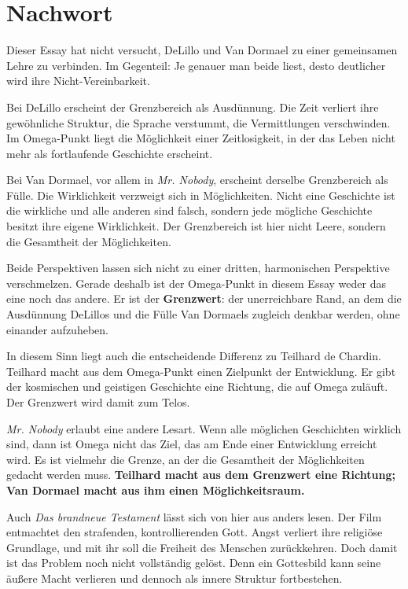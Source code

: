 \documentclass[
  ngerman,
]{article}
\begin{document}
\section{Nachwort}\label{nachwort}

Dieser Essay hat nicht versucht, DeLillo und Van Dormael zu einer
gemeinsamen Lehre zu verbinden. Im Gegenteil: Je genauer man beide
liest, desto deutlicher wird ihre Nicht-Vereinbarkeit.

Bei DeLillo erscheint der Grenzbereich als Ausdünnung. Die Zeit verliert
ihre gewöhnliche Struktur, die Sprache verstummt, die Vermittlungen
verschwinden. Im Omega-Punkt liegt die Möglichkeit einer Zeitlosigkeit,
in der das Leben nicht mehr als fortlaufende Geschichte erscheint.

Bei Van Dormael, vor allem in \emph{Mr. Nobody}, erscheint derselbe
Grenzbereich als Fülle. Die Wirklichkeit verzweigt sich in
Möglichkeiten. Nicht eine Geschichte ist die wirkliche und alle anderen
sind falsch, sondern jede mögliche Geschichte besitzt ihre eigene
Wirklichkeit. Der Grenzbereich ist hier nicht Leere, sondern die
Gesamtheit der Möglichkeiten.

Beide Perspektiven lassen sich nicht zu einer dritten, harmonischen
Perspektive verschmelzen. Gerade deshalb ist der Omega-Punkt in diesem
Essay weder das eine noch das andere. Er ist der \textbf{Grenzwert}: der
unerreichbare Rand, an dem die Ausdünnung DeLillos und die Fülle Van
Dormaels zugleich denkbar werden, ohne einander aufzuheben.

In diesem Sinn liegt auch die entscheidende Differenz zu Teilhard de
Chardin. Teilhard macht aus dem Omega-Punkt einen Zielpunkt der
Entwicklung. Er gibt der kosmischen und geistigen Geschichte eine
Richtung, die auf Omega zuläuft. Der Grenzwert wird damit zum Telos.

\emph{Mr. Nobody} erlaubt eine andere Lesart. Wenn alle möglichen
Geschichten wirklich sind, dann ist Omega nicht das Ziel, das am Ende
einer Entwicklung erreicht wird. Es ist vielmehr die Grenze, an der die
Gesamtheit der Möglichkeiten gedacht werden muss. \textbf{Teilhard macht
aus dem Grenzwert eine Richtung; Van Dormael macht aus ihm einen
Möglichkeitsraum.}

Auch \emph{Das brandneue Testament} lässt sich von hier aus anders
lesen. Der Film entmachtet den strafenden, kontrollierenden Gott. Angst
verliert ihre religiöse Grundlage, und mit ihr soll die Freiheit des
Menschen zurückkehren. Doch damit ist das Problem noch nicht vollständig
gelöst. Denn ein Gottesbild kann seine äußere Macht verlieren und
dennoch als innere Struktur fortbestehen.
\end{document}
